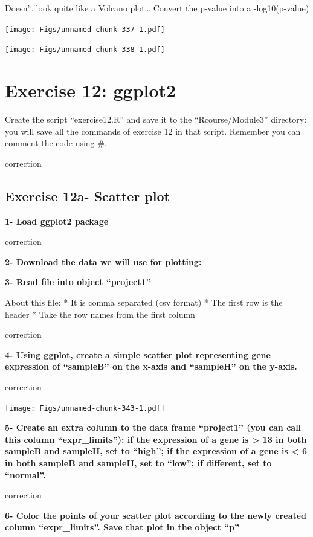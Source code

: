 \documentclass[]{book}
\begin{document}
Doesn't look quite like a Volcano plot\ldots{}
Convert the p-value into a -log10(p-value)

\texttt{[image: Figs/unnamed-chunk-337-1.pdf]}

\texttt{[image: Figs/unnamed-chunk-338-1.pdf]}

\hypertarget{exercise-12-ggplot2}{%
\section{Exercise 12: ggplot2}\label{exercise-12-ggplot2}}

Create the script ``exercise12.R'' and save it to the ``Rcourse/Module3'' directory: you will save all the commands of exercise 12 in that script.
Remember you can comment the code using \#.

correction

\hypertarget{exercise-12a--scatter-plot}{%
\subsection{Exercise 12a- Scatter plot}\label{exercise-12a--scatter-plot}}

\textbf{1- Load ggplot2 package}

correction

\textbf{2- Download the data we will use for plotting:}

\textbf{3- Read file into object ``project1''}

About this file:
* It is comma separated (csv format)
* The first row is the header
* Take the row names from the first column

correction

\textbf{4- Using ggplot, create a simple scatter plot representing gene expression of ``sampleB'' on the x-axis and ``sampleH'' on the y-axis.}

correction

\texttt{[image: Figs/unnamed-chunk-343-1.pdf]}

\textbf{5- Create an extra column to the data frame ``project1'' (you can call this column ``expr\_limits''): if the expression of a gene is \textgreater{} 13 in both sampleB and sampleH, set to ``high''; if the expression of a gene is \textless{} 6 in both sampleB and sampleH, set to ``low''; if different, set to ``normal''.}

correction

\textbf{6- Color the points of your scatter plot according to the newly created column ``expr\_limits''. Save that plot in the object ``p''}
\end{document}
